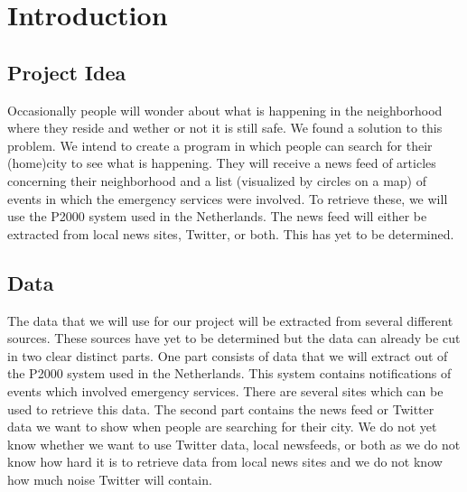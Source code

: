 \section{Introduction}
\subsection*{Project Idea}
Occasionally people will wonder about what is happening in the neighborhood where they reside and wether or not it is still safe.
We found a solution to this problem. We intend to create a program in which people can search for their (home)city to see what is happening. They will receive a news feed of articles concerning their neighborhood and a list (visualized by circles on a map) of events in which the emergency services were involved. To retrieve these, we will use the P2000 system used in the Netherlands. The news feed will either be extracted from local news sites, Twitter, or both. This has yet to be determined.

\subsection*{Data}
The data that we will use for our project will be extracted from several different sources. 
These sources have yet to be determined but the data can already be cut in two clear distinct parts. 
One part consists of data that we will extract out of the P2000 system used in the Netherlands. 
This system contains notifications of events which involved emergency services. 
There are several sites which can be used to retrieve this data.
The second part contains the news feed or Twitter data we want to show when people are searching for their city. 
We do not yet know whether we want to use Twitter data, local newsfeeds, or both as we do not know how hard it is to retrieve data from local news sites and we do not know how much noise Twitter will contain.

